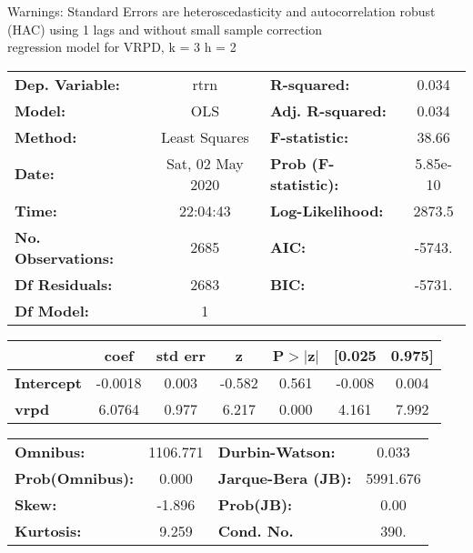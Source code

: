 Warnings: \newline
 [1] Standard Errors are heteroscedasticity and autocorrelation robust (HAC) using 1 lags and without small sample correction\\ 

regression model for VRPD, k = 3 h = 2\begin{center}
\begin{tabular}{lclc}
\toprule
\textbf{Dep. Variable:}    &       rtrn       & \textbf{  R-squared:         } &     0.034   \\
\textbf{Model:}            &       OLS        & \textbf{  Adj. R-squared:    } &     0.034   \\
\textbf{Method:}           &  Least Squares   & \textbf{  F-statistic:       } &     38.66   \\
\textbf{Date:}             & Sat, 02 May 2020 & \textbf{  Prob (F-statistic):} &  5.85e-10   \\
\textbf{Time:}             &     22:04:43     & \textbf{  Log-Likelihood:    } &    2873.5   \\
\textbf{No. Observations:} &        2685      & \textbf{  AIC:               } &    -5743.   \\
\textbf{Df Residuals:}     &        2683      & \textbf{  BIC:               } &    -5731.   \\
\textbf{Df Model:}         &           1      & \textbf{                     } &             \\
\bottomrule
\end{tabular}
\begin{tabular}{lcccccc}
                   & \textbf{coef} & \textbf{std err} & \textbf{z} & \textbf{P$> |$z$|$} & \textbf{[0.025} & \textbf{0.975]}  \\
\midrule
\textbf{Intercept} &      -0.0018  &        0.003     &    -0.582  &         0.561        &       -0.008    &        0.004     \\
\textbf{vrpd}      &       6.0764  &        0.977     &     6.217  &         0.000        &        4.161    &        7.992     \\
\bottomrule
\end{tabular}
\begin{tabular}{lclc}
\textbf{Omnibus:}       & 1106.771 & \textbf{  Durbin-Watson:     } &    0.033  \\
\textbf{Prob(Omnibus):} &   0.000  & \textbf{  Jarque-Bera (JB):  } & 5991.676  \\
\textbf{Skew:}          &  -1.896  & \textbf{  Prob(JB):          } &     0.00  \\
\textbf{Kurtosis:}      &   9.259  & \textbf{  Cond. No.          } &     390.  \\
\bottomrule
\end{tabular}
\end{center}

